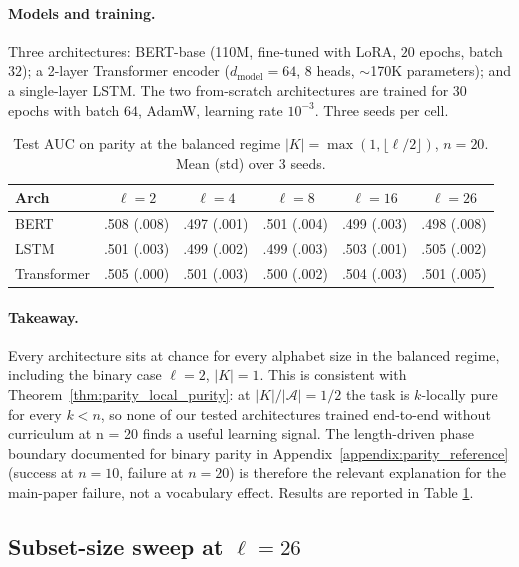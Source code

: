 \documentclass{article}
\theoremstyle{plain}
\theoremstyle{definition}
\theoremstyle{remark}
\begin{document}
\paragraph{Models and training.} Three architectures: BERT-base (110M, fine-tuned with LoRA, $20$ epochs, batch $32$); a 2-layer Transformer encoder ($d_{\text{model}}=64$, 8 heads, $\sim$170K parameters); and a single-layer LSTM. The two from-scratch architectures are trained for $30$ epochs with batch $64$, AdamW, learning rate $10^{-3}$. Three seeds per cell.

\begin{table}[h]
\centering
\caption{Test AUC on parity at the balanced regime $|K| = \max(1, \lfloor \ell/2 \rfloor)$, $n = 20$. Mean (std) over 3 seeds.}
\label{tab:parity_vocab}
\begin{tabular}{@{}lccccc@{}}
\toprule
Arch & $\ell{=}2$ & $\ell{=}4$ & $\ell{=}8$ & $\ell{=}16$ & $\ell{=}26$ \\
\midrule
BERT        & .508 (.008) & .497 (.001) & .501 (.004) & .499 (.003) & .498 (.008) \\
LSTM        & .501 (.003) & .499 (.002) & .499 (.003) & .503 (.001) & .505 (.002) \\
Transformer & .505 (.000) & .501 (.003) & .500 (.002) & .504 (.003) & .501 (.005) \\
\bottomrule
\end{tabular}
\end{table}

\paragraph{Takeaway.} Every architecture sits at chance for every alphabet size in the balanced regime, including the binary case $\ell = 2$, $|K| = 1$. This is consistent with Theorem~\ref{thm:parity_local_purity}: at $|K|/|\mathcal{A}|=1/2$ the task is $k$-locally pure for every $k<n$, so none of our tested architectures trained end-to-end without curriculum at n = 20 finds a useful learning signal. The length-driven phase boundary documented for binary parity in Appendix~\ref{appendix:parity_reference} (success at $n = 10$, failure at $n = 20$) is therefore the relevant explanation for the main-paper failure, not a vocabulary effect. Results are reported in Table \ref{tab:parity_vocab}.

\subsection{Subset-size sweep at $\ell = 26$}
\label{app:parity_subset}
\end{document}

